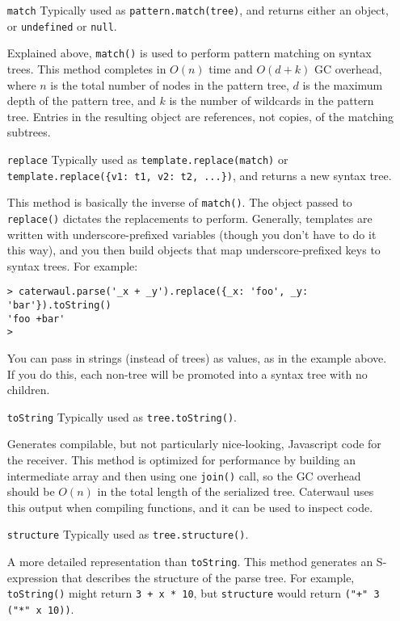 \documentclass{report}
\begin{document}
\begin{enumerate}
\item[{\tt match}]
  Typically used as {\tt pattern.match(tree)}, and returns either an object, or {\tt undefined} or {\tt null}.

  Explained above, {\tt match()} is used to perform pattern matching on syntax trees. This method completes in $O(n)$ time and $O(d + k)$ GC overhead, where $n$ is the total number of
  nodes in the pattern tree, $d$ is the maximum depth of the pattern tree, and $k$ is the number of wildcards in the pattern tree. Entries in the resulting object are references, not
  copies, of the matching subtrees.

\item[{\tt replace}]
  Typically used as {\tt template.replace(match)} or \verb|template.replace({v1: t1, v2: t2, ...})|, and returns a new syntax tree.

  This method is basically the inverse of {\tt match()}. The object passed to {\tt replace()} dictates the replacements to perform. Generally, templates are written with
  underscore-prefixed variables (though you don't have to do it this way), and you then build objects that map underscore-prefixed keys to syntax trees. For example:

\begin{verbatim}
> caterwaul.parse('_x + _y').replace({_x: 'foo', _y: 'bar'}).toString()
'foo +bar'
>
\end{verbatim}

  You can pass in strings (instead of trees) as values, as in the example above. If you do this, each non-tree will be promoted into a syntax tree with no children.

\item[{\tt toString}]
  Typically used as {\tt tree.toString()}.

  Generates compilable, but not particularly nice-looking, Javascript code for the receiver. This method is optimized for performance by building an intermediate array and then using one
  {\tt join()} call, so the GC overhead should be $O(n)$ in the total length of the serialized tree. Caterwaul uses this output when compiling functions, and it can be used to inspect
  code.

\item[{\tt structure}]
  Typically used as {\tt tree.structure()}.

  A more detailed representation than {\tt toString}. This method generates an S-expression that describes the structure of the parse tree. For example, {\tt toString()} might return
  {\tt 3 + x * 10}, but {\tt structure} would return \verb|("+" 3 ("*" x 10))|.


\end{enumerate}
\end{document}
